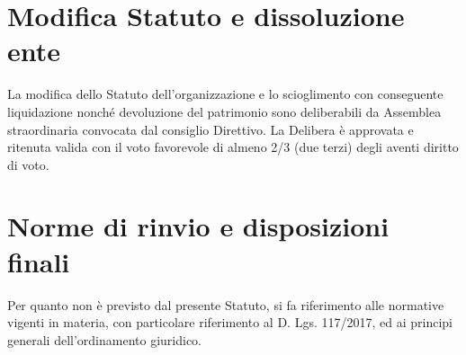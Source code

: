 \documentclass[legalpaper, 11pt]{exam}
\let\tempone\enumerate
\let\temptwo\endenumerate
\renewenvironment{enumerate}{\tempone\addtolength{\itemsep}{-0.45\baselineskip}}{\temptwo}
\begin{document}
{\section{Modifica Statuto e dissoluzione ente}
\begin{enumerate}
\item La modifica dello Statuto dell’organizzazione e lo scioglimento con conseguente liquidazione nonché devoluzione del patrimonio sono deliberabili da Assemblea straordinaria convocata dal consiglio Direttivo. La Delibera è approvata e ritenuta valida con il voto favorevole di almeno 2/3 (due terzi) degli aventi diritto di voto.
\end{enumerate}

\section{Norme di rinvio e disposizioni finali}
\begin{enumerate}
 \item Per quanto non è previsto dal presente Statuto, si fa riferimento alle normative vigenti in materia, con particolare riferimento al D. Lgs. 117/2017, ed ai principi generali dell’ordinamento giuridico.
\end{enumerate}
}
\end{document}
